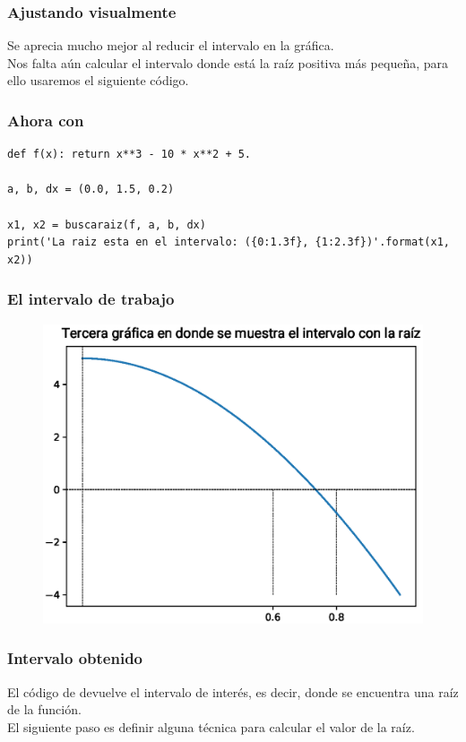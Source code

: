 \documentclass[12pt]{beamer}
\begin{document}
\begin{frame}
\frametitle{Ajustando visualmente}
Se aprecia mucho mejor al reducir el intervalo en la gráfica.
\\
\bigskip
\pause
Nos falta aún calcular el intervalo donde está la raíz positiva más pequeña, para ello usaremos el siguiente código.
\end{frame}
\begin{frame}[fragile]
\frametitle{Ahora con \python}
\begin{lstlisting}[caption=Solución al ejercicio]
def f(x): return x**3 - 10 * x**2 + 5.

a, b, dx = (0.0, 1.5, 0.2)

x1, x2 = buscaraiz(f, a, b, dx)
print('La raiz esta en el intervalo: ({0:1.3f}, {1:2.3f})'.format(x1, x2))
\end{lstlisting}
\end{frame}
\begin{frame}
\frametitle{El intervalo de trabajo}
\begin{figure}
	\centering
	\includegraphics[scale=0.5]{Imagenes/aprox_sucesivas_03.eps}
\end{figure}
\end{frame}
\begin{frame}
\frametitle{Intervalo obtenido}
El código de \python{} devuelve el intervalo de interés, es decir, donde se encuentra una raíz de la función.
\\
\bigskip
\pause
El siguiente paso es definir alguna técnica para calcular el valor de la raíz.
\end{frame}
\end{document}
